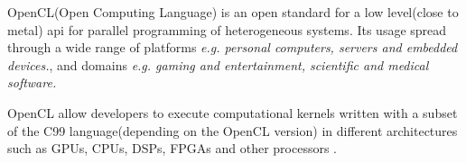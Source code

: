 \par{OpenCL(Open Computing Language) is an open standard for a low level(close to metal) api for parallel programming of 
    heterogeneous systems. Its usage spread through a wide range of platforms \emph{e.g. personal computers, servers and 
    embedded devices.}, and domains \emph{e.g. gaming and entertainment, scientific and medical software.}
    \cite{khronos,nvidia_opencl,opencl12}}

\par{OpenCL allow developers to execute computational kernels written with a subset of the C99 language(depending on the OpenCL 
    version) in different architectures \cite{nvidia_opencl} such as GPUs, CPUs, DSPs, FPGAs and other processors 
    \cite{wikipedia_opencl}.}
